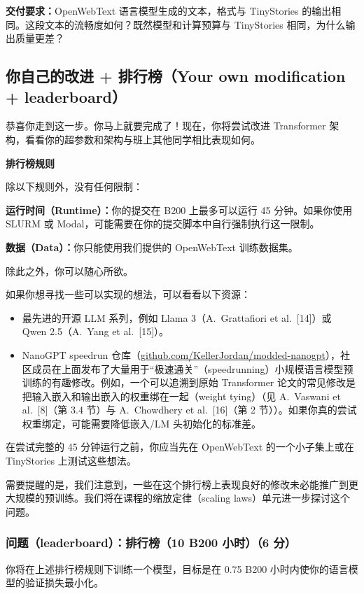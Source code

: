 \textbf{交付要求：}OpenWebText 语言模型生成的文本，格式与 TinyStories 的输出相同。这段文本的流畅度如何？既然模型和计算预算与 TinyStories 相同，为什么输出质量更差？

\subsection{你自己的改进 + 排行榜（Your own modification + leaderboard）}

恭喜你走到这一步。你马上就要完成了！现在，你将尝试改进 Transformer 架构，看看你的超参数和架构与班上其他同学相比表现如何。

\textbf{排行榜规则}

除以下规则外，没有任何限制：

\textbf{运行时间（Runtime）：}你的提交在 B200 上最多可以运行 45 分钟。如果你使用 SLURM 或 Modal，可能需要在你的提交脚本中自行强制执行这一限制。

\textbf{数据（Data）：}你只能使用我们提供的 OpenWebText 训练数据集。

除此之外，你可以随心所欲。

如果你想寻找一些可以实现的想法，可以看看以下资源：
\begin{itemize}
  \item 最先进的开源 LLM 系列，例如 Llama 3（A.~Grattafiori et al.~[14]）或 Qwen 2.5（A.~Yang et al.~[15]）。
  \item NanoGPT speedrun 仓库（\url{github.com/KellerJordan/modded-nanogpt}），社区成员在上面发布了大量用于``极速通关''（speedrunning）小规模语言模型预训练的有趣修改。例如，一个可以追溯到原始 Transformer 论文的常见修改是把输入嵌入和输出嵌入的权重绑在一起（weight tying）（见 A.~Vaswani et al.~[8]（第 3.4 节）与 A.~Chowdhery et al.~[16]（第 2 节））。如果你真的尝试权重绑定，可能需要降低嵌入/LM 头初始化的标准差。
\end{itemize}

在尝试完整的 45 分钟运行之前，你应当先在 OpenWebText 的一个小子集上或在 TinyStories 上测试这些想法。

需要提醒的是，我们注意到，一些在这个排行榜上表现良好的修改未必能推广到更大规模的预训练。我们将在课程的缩放定律（scaling laws）单元进一步探讨这个问题。

\subsubsection*{问题（leaderboard）：排行榜（10 B200 小时）（6 分）}

你将在上述排行榜规则下训练一个模型，目标是在 0.75 B200 小时内使你的语言模型的验证损失最小化。

